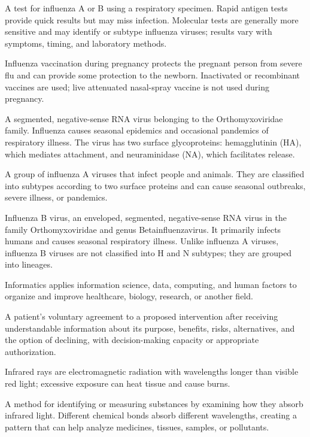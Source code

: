  A test for influenza A or B using a respiratory specimen. Rapid antigen tests provide quick results
but may miss infection. Molecular tests are generally more sensitive and may identify or
subtype influenza viruses; results vary with symptoms, timing, and laboratory methods.

 Influenza vaccination during pregnancy protects the pregnant person from severe flu and can provide some protection to the newborn. Inactivated or recombinant vaccines are used; live attenuated nasal-spray vaccine is not used during pregnancy.

 A segmented, negative-sense RNA virus belonging to the Orthomyxoviridae family.
Influenza causes seasonal epidemics and occasional pandemics of respiratory illness. The
virus has two surface glycoproteins: hemagglutinin (HA), which mediates attachment, and
neuraminidase (NA), which facilitates release.

 A group of influenza A viruses that infect people and animals. They are classified into subtypes according to two surface proteins and can cause seasonal outbreaks, severe illness, or pandemics.

 Influenza B virus, an enveloped, segmented, negative-sense RNA
virus in the family Orthomyxoviridae and genus Betainfluenzavirus. It primarily infects
humans and causes seasonal respiratory illness. Unlike influenza A viruses, influenza B
viruses are not classified into H and N subtypes; they are grouped into lineages.

 Informatics applies information science, data, computing, and human factors to organize and improve healthcare, biology, research, or another field.

 A patient's voluntary agreement to a proposed intervention after receiving understandable information about its purpose, benefits, risks, alternatives, and the option of declining, with decision-making capacity or appropriate authorization.

 Infrared rays are electromagnetic radiation with wavelengths longer than visible red light; excessive exposure can heat tissue and cause burns.

 A method for identifying or measuring substances by examining how they absorb infrared light. Different chemical bonds absorb different wavelengths, creating a pattern that can help analyze medicines, tissues, samples, or pollutants.

